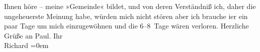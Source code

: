\begin{ledgroupsized}[t]{13cm}
               Ihnen höre – meine »Gemeinde« bildet, und von deren Verständniß ich, daher die
               ungeheuerste Meinung habe, würden mich nicht stören aber ich brauche i{\geminationm}er ein paar Tage um mich einzugewöhnen und die 6–8 Tage
               wären verloren.\pend
           \pstart
           Herzliche Grüße an Paul.\pend
           \pstart
           Ihr{\\[\baselineskip]}\spacefill\mbox{Richard}\pend
           \leftskip=0em{}\endnumbering{}\end{ledgroupsized}  \newcommand{\dateiname}{L01164}\newcommand{\titel}{Richard Beer-Hofmann an Arthur Schnitzler, 20. 8. 1901}\newcommand{\editorInnen}{Martin Anton Müller und Gerd-Hermann Susen}
      